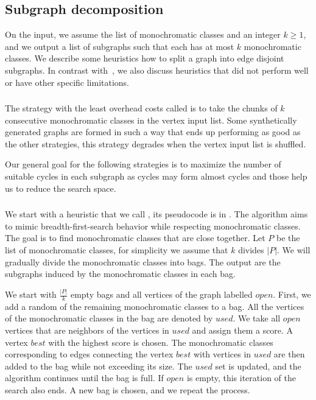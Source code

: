 \subsection{Subgraph decomposition}%
\label{sec:decomposition}

On the input, we assume the list of monochromatic classes
and an integer $k\geq 1$, and we output a list of subgraphs
such that each has at most $k$ monochromatic classes.
We describe some heuristics how to split a graph into edge disjoint subgraphs.
In contrast with~\cite{my_paper}, we also discuss heuristics
that did not perform well or have other specific limitations.

\subsubsection*{\None{}}

The strategy with the least overhead costs called \None{}
is to take the chunks of $k$ consecutive
monochromatic classes in the vertex input list.
Some synthetically generated graphs are formed in such a way
that \None{} ends up performing as good as the other strategies,
this strategy degrades when the vertex input list is shuffled.

Our general goal for the following strategies
is to maximize the number of suitable cycles in each
subgraph as cycles may form almost cycles and those help us
to reduce the search space.

\subsubsection*{\Neighbors{}}

We start with a heuristic that we call \Neighbors{},
its pseudocode is in .
The algorithm aims to mimic breadth-first-search
behavior while respecting monochromatic classes.
The goal is to find monochromatic classes that are close together.
Let $P$ be the list of monochromatic classes,
for simplicity we assume that $k$ divides $|P|$.
We will gradually divide the monochromatic classes into bags.
The output are the subgraphs induced by the monochromatic classes in each bag.

We start with $\frac{|P|}{k}$ empty bags
and all vertices of the graph labelled $open$.
First, we add a random of the remaining monochromatic classes to a bag.
All the vertices of the monochromatic classes in the bag are denoted by $used$.
We take all $open$ vertices that are neighbors of the vertices in $used$ and assign
them a score. A vertex $best$ with the highest score is chosen.
The monochromatic classes corresponding to edges connecting the vertex $best$
with vertices in $used$ are then added to the bag while not exceeding its size.
The $used$ set is updated, and the algorithm continues until the bag is full.
If $open$ is empty, this iteration of the search also ends.
A new bag is chosen, and we repeat the process.

